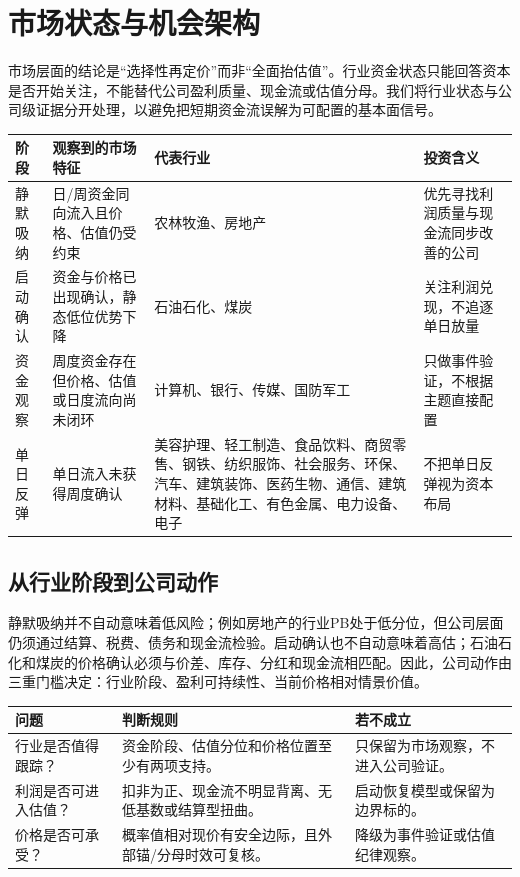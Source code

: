 \chapter{市场状态与机会架构}

市场层面的结论是“选择性再定价”而非“全面抬估值”。行业资金状态只能回答资本是否开始关注，不能替代公司盈利质量、现金流或估值分母。我们将行业状态与公司级证据分开处理，以避免把短期资金流误解为可配置的基本面信号。

\noindent
\begin{exhibitbox}[图表 4｜31个一级行业的阶段划分与投资含义]
\small
\begin{tabularx}{\textwidth}{L{1.9cm}L{3.5cm}X L{4.2cm}}
\toprule
\textbf{阶段} & \textbf{观察到的市场特征} & \textbf{代表行业} & \textbf{投资含义} \\
\midrule
静默吸纳 & 日/周资金同向流入且价格、估值仍受约束 & 农林牧渔、房地产 & 优先寻找利润质量与现金流同步改善的公司 \\
启动确认 & 资金与价格已出现确认，静态低位优势下降 & 石油石化、煤炭 & 关注利润兑现，不追逐单日放量 \\
资金观察 & 周度资金存在但价格、估值或日度流向尚未闭环 & 计算机、银行、传媒、国防军工 & 只做事件验证，不根据主题直接配置 \\
单日反弹 & 单日流入未获得周度确认 & 美容护理、轻工制造、食品饮料、商贸零售、钢铁、纺织服饰、社会服务、环保、汽车、建筑装饰、医药生物、通信、建筑材料、基础化工、有色金属、电力设备、电子 & 不把单日反弹视为资本布局 \\
\bottomrule
\end{tabularx}
\normalsize
{}
\end{exhibitbox}

\section{从行业阶段到公司动作}

静默吸纳并不自动意味着低风险；例如房地产的行业PB处于低分位，但公司层面仍须通过结算、税费、债务和现金流检验。启动确认也不自动意味着高估；石油石化和煤炭的价格确认必须与价差、库存、分红和现金流相匹配。因此，公司动作由三重门槛决定：行业阶段、盈利可持续性、当前价格相对情景价值。

\noindent
\begin{tabularx}{\textwidth}{L{3.2cm}X L{4.0cm}}
\toprule
\textbf{问题} & \textbf{判断规则} & \textbf{若不成立} \\
\midrule
行业是否值得跟踪？ & 资金阶段、估值分位和价格位置至少有两项支持。 & 只保留为市场观察，不进入公司验证。 \\
利润是否可进入估值？ & 扣非为正、现金流不明显背离、无低基数或结算型扭曲。 & 启动恢复模型或保留为边界标的。 \\
价格是否可承受？ & 概率值相对现价有安全边际，且外部锚/分母时效可复核。 & 降级为事件验证或估值纪律观察。 \\
\bottomrule
\end{tabularx}
